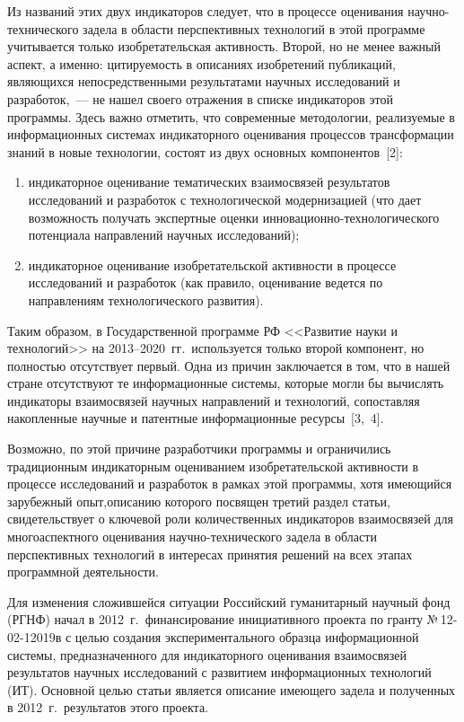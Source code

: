 \begin{multicols}{2}
    Из названий этих двух индикаторов следует, что в процессе оценивания 
    научно-технического задела в области перспективных технологий в этой программе учитывается 
только изобретательская активность. Второй, но не менее важный аспект, а именно: 
цитируемость в описаниях изобретений публикаций, являющихся непосредственными 
результатами научных исследований и разработок,~--- не нашел своего отражения в списке 
индикаторов этой программы. Здесь важно отметить, что современные методологии, 
реализуемые в информационных системах индикаторного оценивания процессов 
трансформации знаний в новые технологии, состоят из двух основных компонентов~[2]:
    \begin{enumerate}[(1)]
    \item индикаторное оценивание тематических взаимосвязей результатов исследований и 
разработок с технологической модернизацией (что дает возможность получать экспертные 
оценки ин\-но\-ва\-ци\-он\-но-тех\-но\-ло\-ги\-че\-ско\-го потенциала направлений научных 
исследований);
    \item индикаторное оценивание изобретательской активности в процессе исследований и 
разработок (как правило, оценивание ведется по направлениям технологического развития).
    \end{enumerate}
    
    Таким образом, в Государственной программе РФ <<Развитие науки и технологий>> на 
2013--2020~гг.\ используется только второй компонент, но полностью отсутствует первый. 
Одна из причин заключается в том, что в нашей стране отсутствуют те информационные 
системы, которые могли бы вычислять индикаторы взаимосвязей научных направлений и 
технологий, сопоставляя накопленные научные и патентные информационные ресур\-сы~[3,~4].
    
    Возможно, по этой причине разработчики программы и ограничились традиционным 
индикаторным оцениванием изобретательской активности в процессе исследований и 
разработок в рамках этой программы, хотя имеющийся зарубежный опыт,\linebreak описанию которого 
посвящен третий раздел статьи, свидетельствует о ключевой роли количественных индикаторов 
взаимосвязей для многоаспектного оценивания на\-уч\-но-тех\-ни\-че\-ско\-го задела в \mbox{области} 
перспективных технологий в интересах принятия решений на всех этапах программной 
де\-я\-тель\-ности.
    
    Для изменения сложившейся ситуации Российский гуманитарный научный фонд (РГНФ) 
начал в 2012~г.\ финансирование инициативного проекта по гранту №\,12-02-12019в с целью 
создания экспериментального образца информационной системы, предназначенного для 
индикаторного оценивания взаимосвязей результатов научных исследований с развитием 
информационных технологий (ИТ). Основной целью статьи является описание имеющего задела и 
полученных в 2012~г.\ результатов этого проекта.


\end{multicols}
